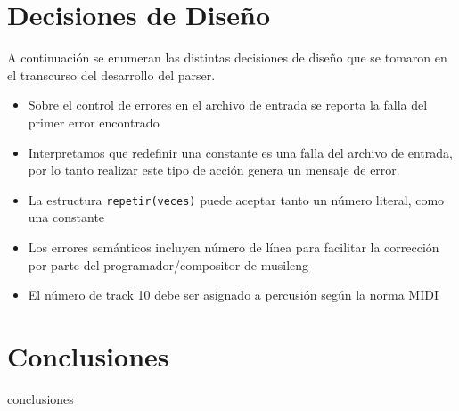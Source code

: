 \documentclass[a4paper,8pt]{article}
\begin{document}
\section{Decisiones de Diseño}
A continuación se enumeran las distintas decisiones de diseño que se tomaron en el transcurso del desarrollo del parser.
\begin{itemize}
\item Sobre el control de errores en el archivo de entrada se reporta la falla del primer error encontrado
\item Interpretamos que redefinir una constante es una falla del archivo de entrada, por lo tanto realizar este tipo de acción genera un mensaje de error.
\item La estructura \texttt{repetir(veces){}} puede aceptar tanto un número literal, como una constante
\item Los errores semánticos incluyen número de línea para facilitar la corrección por parte del programador/compositor de musileng
\item El número de track 10 debe ser asignado a percusión según la norma MIDI
\end{itemize}

\section{Conclusiones}
conclusiones

\newpage
\end{document}
